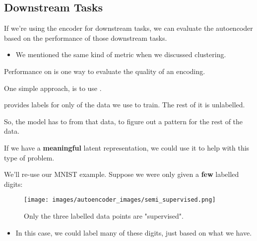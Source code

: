     \subsection{Downstream Tasks}

        If we're using the encoder for downstream tasks, we can evaluate the autoencoder based on the performance of those downstream tasks.

        \begin{itemize}
            \item We mentioned the same kind of metric when we discussed clustering.\\
        \end{itemize}

        \begin{concept}
            Performance on  is one way to evaluate the quality of an encoding.
        \end{concept}

        One simple approach, is to use .\\

        \begin{definition}
             provides labels for only  of the data we use to train. The rest of it is unlabelled.

            So, the model has to  from that data, to figure out a pattern for the rest of the data.
        \end{definition}

        If we have a \textbf{meaningful} latent representation, we could use it to help with this type of problem.

        \miniex We'll re-use our MNIST example. Suppose we were only given a \textbf{few} labelled digits:
            

        \begin{figure}[H]
            \centering
            \texttt{[image: images/autoencoder\_images/semi\_supervised.png]}
            \caption*{Only the three labelled data points are "supervised".}
        \end{figure}

        \begin{itemize}
            \item In this case, we could label many of these digits, just based on what we have.
        \end{itemize}


